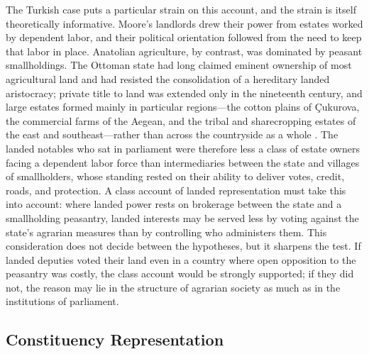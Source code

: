 \documentclass[12pt]{article}
\begin{document}
The Turkish case puts a particular strain on this account, and the strain is itself theoretically informative. Moore's landlords drew their power from estates worked by dependent labor, and their political orientation followed from the need to keep that labor in place. Anatolian agriculture, by contrast, was dominated by peasant smallholdings. The Ottoman state had long claimed eminent ownership of most agricultural land and had resisted the consolidation of a hereditary landed aristocracy; private title to land was extended only in the nineteenth century, and large estates formed mainly in particular regions---the cotton plains of Çukurova, the commercial farms of the Aegean, and the tribal and sharecropping estates of the east and southeast---rather than across the countryside as a whole \citep{keyder1987,pamuk2018}. The landed notables who sat in parliament were therefore less a class of estate owners facing a dependent labor force than intermediaries between the state and villages of smallholders, whose standing rested on their ability to deliver votes, credit, roads, and protection. A class account of landed representation must take this into account: where landed power rests on brokerage between the state and a smallholding peasantry, landed interests may be served less by voting against the state's agrarian measures than by controlling who administers them. This consideration does not decide between the hypotheses, but it sharpens the test. If landed deputies voted their land even in a country where open opposition to the peasantry was costly, the class account would be strongly supported; if they did not, the reason may lie in the structure of agrarian society as much as in the institutions of parliament.

\subsection*{Constituency Representation}
\end{document}
